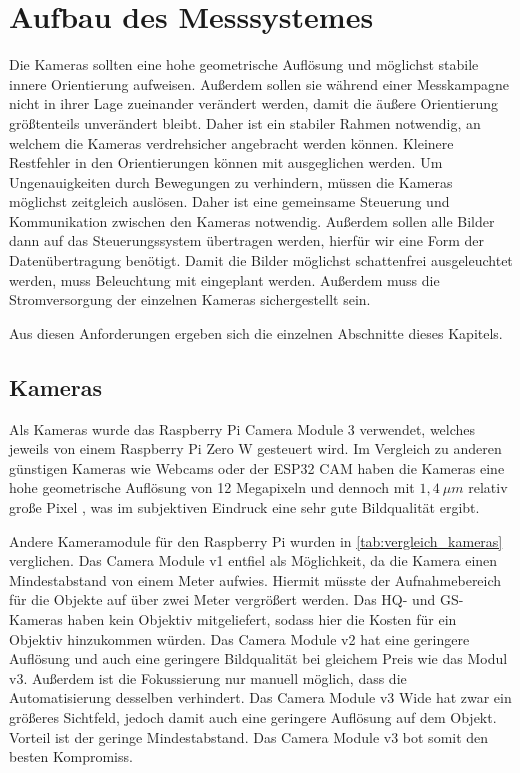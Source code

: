 \documentclass[./00PhotoBox.tex]{subfiles}
\begin{document}
\chapter{Aufbau des Messsystemes}
Die Kameras sollten eine hohe geometrische Auflösung und möglichst stabile innere Orientierung aufweisen. Außerdem sollen sie während einer Messkampagne nicht in ihrer Lage zueinander verändert werden, damit die äußere Orientierung größtenteils unverändert bleibt. Daher ist ein stabiler Rahmen notwendig, an welchem die Kameras verdrehsicher angebracht werden können. Kleinere Restfehler in den Orientierungen können mit ausgeglichen werden.
Um Ungenauigkeiten durch Bewegungen zu verhindern, müssen die Kameras möglichst zeitgleich auslösen. Daher ist eine gemeinsame Steuerung und Kommunikation zwischen den Kameras notwendig. Außerdem sollen alle Bilder dann auf das Steuerungssystem übertragen werden, hierfür wir eine Form der Datenübertragung benötigt. Damit die Bilder möglichst schattenfrei ausgeleuchtet werden, muss Beleuchtung mit eingeplant werden. Außerdem muss die Stromversorgung der einzelnen Kameras sichergestellt sein.

Aus diesen Anforderungen ergeben sich die einzelnen Abschnitte dieses Kapitels.

\section{Kameras}
Als Kameras wurde das Raspberry Pi Camera Module 3 verwendet, welches jeweils von einem Raspberry Pi Zero W gesteuert wird. Im Vergleich zu anderen günstigen Kameras wie Webcams oder der ESP32 CAM haben die Kameras eine hohe geometrische Auflösung von 12 Megapixeln und dennoch mit $1,4~\mu m$ relativ große Pixel \citep{raspicamdatasheet}, was im subjektiven Eindruck eine sehr gute Bildqualität ergibt.

Andere Kameramodule für den Raspberry Pi wurden in \autoref{tab:vergleich_kameras} verglichen. Das Camera Module v1 entfiel als Möglichkeit, da die Kamera einen Mindestabstand von einem Meter aufwies. Hiermit müsste der Aufnahmebereich für die Objekte auf über zwei Meter vergrößert werden. Das HQ- und GS-Kameras haben kein Objektiv mitgeliefert, sodass hier die Kosten für ein Objektiv hinzukommen würden. Das Camera Module v2 hat eine geringere Auflösung und auch eine geringere Bildqualität bei gleichem Preis wie das Modul v3. Außerdem ist die Fokussierung nur manuell möglich, dass die Automatisierung desselben verhindert. Das Camera Module v3 Wide hat zwar ein größeres Sichtfeld, jedoch damit auch eine geringere Auflösung auf dem Objekt. Vorteil ist der geringe Mindestabstand. Das Camera Module v3 bot somit den besten Kompromiss.
\end{document}

